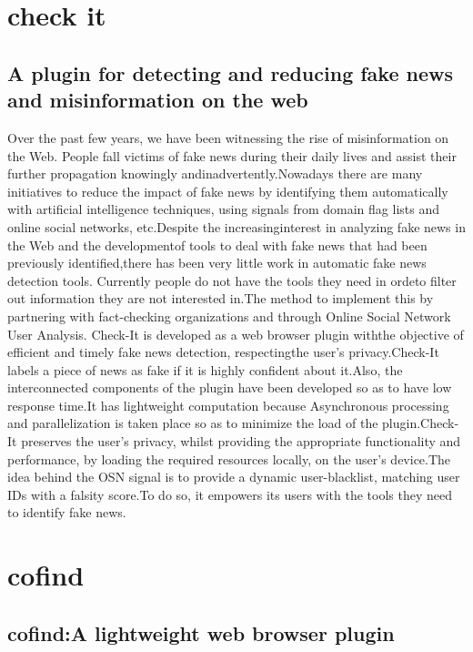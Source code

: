 \section{check it}
\subsection{A plugin for detecting and reducing fake news and misinformation on the web}
Over the past few years, we have been witnessing the rise of misinformation on the Web. People fall victims of fake news during their daily lives and assist their further propagation knowingly andinadvertently.Nowadays there are many initiatives to reduce the impact of fake news by identifying them automatically with artificial intelligence techniques, using signals from domain flag lists and online social networks, etc.Despite the increasinginterest in analyzing fake news in the Web and the developmentof tools to deal with fake news that had been previously identified,there has been very little work in automatic fake news detection tools. Currently people do not have the tools they need in ordeto filter out information they are not interested in.The method to implement this by partnering with fact-checking  organizations and through Online Social Network User Analysis. Check-It is developed as a web browser plugin withthe objective of efficient and timely fake news detection, respectingthe user’s privacy.Check-It labels a piece of news as fake if it is highly confident about it.Also, the interconnected components of the plugin have been developed so as to have low response time.It has lightweight computation because Asynchronous processing and parallelization is taken place so as to minimize the load of the plugin.Check-It preserves the user’s privacy, whilst providing the appropriate functionality and performance, by loading the required resources locally, on the user’s device.The idea behind the OSN signal is to provide a dynamic user-blacklist, matching user IDs with a falsity score.To do so, it empowers its users with the tools they need to identify fake news.

\section{cofind}
\subsection{cofind:A lightweight web browser plugin}

